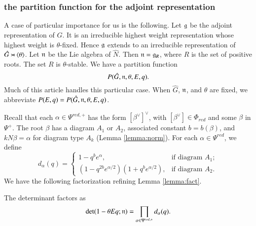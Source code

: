 \subsubsection{the partition function for the adjoint representation}\label{sec:adjoint}

A case of particular importance for us is the following.  Let ${\mathfrak g}$ be
the adjoint representation of $\hat G$.  It is an irreducible highest
weight representation whose highest weight is $\theta$-fixed.  Hence
${\mathfrak g}$ extends to an irreducible representation of $\hat
G\rtimes\langle{\theta}\rangle$.  Let ${\mathfrak n}$ be the Lie algebra of $\hat N$.  Then
${\mathfrak n} = {\mathfrak g}_R$, where $R$ is the set of positive roots.  The set $R$ is
$\theta$-stable.  We have a partition function
\[
P(\hat G,{\mathfrak n},\theta,E,q).
\]
Much of this article handles this particular case.  When $\hat G$,
${\mathfrak n}$, and $\theta$ are fixed, we abbreviate $P(E,q) = P(\hat
G,{\mathfrak n},\theta,E,q)$.

Recall that each $\alpha\in \Psi^{red,+}$ has the form
$[\beta^\vee]^\vee$, with $[\beta^\vee]\in \Phi_{red}$ and some
$\beta$ in $\Psi^+$.  The root $\beta$ has a diagram $A_1$ or $A_2$,
associated constant $b=b(\beta)$, and $k N\beta = \alpha$ for diagram
type $A_k$ (Lemma \ref{lemma:norm}).  For each $\alpha\in \Psi^{red}$,
we define
\begin{equation}\label{eqn:d}
d_\alpha(q) =
\begin{cases} {1-q^b e^\alpha},    &\text{if diagram } A_1;\\
{(1-q^{2b} e^{\alpha/2})(1+q^b e^{\alpha/2})},
&\text{if diagram } A_2.
\end{cases}
\end{equation}
We have the following factorization refining Lemma \ref{lemma:fact}.

\begin{lemma} \label{lemma:prod}
The determinant factors as
\[
\det(1-\theta  E q ;{\mathfrak n}) = \prod_{\alpha\in\Psi^{red,+}} d_\alpha(q).
\]
\end{lemma}


